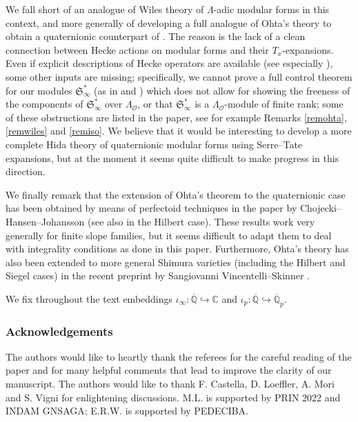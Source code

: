 \documentclass[a4paper,11pt]{amsart}
\numberwithin{equation}{section}
\theoremstyle{plain}
\theoremstyle{definition}
\theoremstyle{remark}
\newcommand{\Q}{\mathbb{Q}}
\newcommand{\C}{\mathbb{C}}
\begin{document}
We fall short of an analogue of Wiles theory of $\Lambda$-adic modular forms in this context, and more generally of developing a full analogue of Ohta's theory to obtain a quaternionic counterpart of \cite[Theorem 2.3.6]{Ohta-ES}. The reason is the lack of a clean connection between Hecke actions on modular forms and their $T_x$-expansions. Even if explicit descriptions of Hecke operators are available (see especially \cite[\S4.4]{Brooks}), some other inputs are missing; specifically, we cannot prove a full control theorem for our modules $\mathfrak{S}_\infty^*$ (as in \cite[\S7.3, Theorem 6]{hida-elementary} and \cite[Theorem 2.5.3]{Ohta-ES}) which does not allow for showing the freeness of the components of $\mathfrak{S}_\infty^*$ over $\Lambda_\mathcal{O}$, or that $\mathfrak{S}_\infty^*$ is a $\Lambda_\mathcal{O}$-module of finite rank; some of these obstructions are listed in the paper, see for example Remarks \ref{remohta}, \ref{remwiles} and \ref{remiso}. We believe that it would be interesting to develop a more complete Hida theory of quaternionic modular forms using Serre--Tate expansions, but at the moment it seems quite difficult to make progress in this direction. 

We finally remark that the extension of Ohta's theorem to the quaternionic case has been obtained by means of perfectoid techniques in the paper \cite{CHJ} by Chojecki--Hansen--Johansson (see also \cite{BHW} in the Hilbert case). These results work very generally for finite slope families, but it seems difficult to adapt them to deal with integrality conditions as done in this paper. Furthermore, Ohta's theory has also been extended to more general Shimura varieties (including the Hilbert and Siegel cases) in the recent preprint by Sangiovanni Vincentelli--Skinner \cite{SSV}. 

We fix throughout the text embeddings $\iota_\infty:\overline{\Q}\hookrightarrow\C$ and $\iota_p:\overline{\Q}\hookrightarrow\overline{\Q}_p$.

\subsubsection*{Acknowledgements}
{The authors would like to  heartly thank the referees for the careful reading of the paper and for many helpful
comments that lead to improve the clarity of our manuscript. The authors would like to thank F. Castella, D. Loeffler, A. Mori and S. Vigni for enlightening discussions. M.L. is supported by PRIN 2022 and INDAM GNSAGA; E.R.W. is supported by PEDECIBA.} 
 
\end{document}
